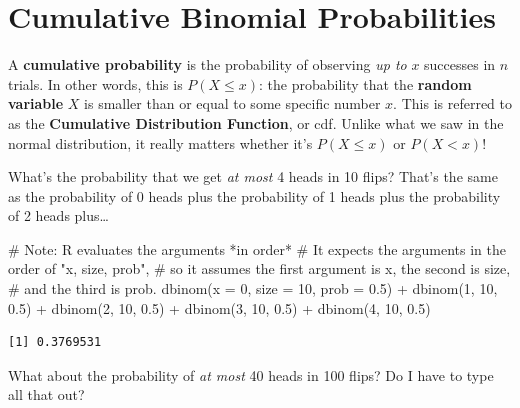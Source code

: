 \documentclass[
  letterpaper,
  DIV=11,
  numbers=noendperiod]{scrreprt}
\newenvironment{Shaded}{\begin{snugshade}}{\end{snugshade}}
\newcommand{\AttributeTok}[1]{\textcolor[rgb]{0.40,0.45,0.13}{#1}}
\newcommand{\CommentTok}[1]{\textcolor[rgb]{0.37,0.37,0.37}{#1}}
\newcommand{\DecValTok}[1]{\textcolor[rgb]{0.68,0.00,0.00}{#1}}
\newcommand{\FloatTok}[1]{\textcolor[rgb]{0.68,0.00,0.00}{#1}}
\newcommand{\FunctionTok}[1]{\textcolor[rgb]{0.28,0.35,0.67}{#1}}
\newcommand{\NormalTok}[1]{\textcolor[rgb]{0.00,0.23,0.31}{#1}}
\newcommand{\SpecialCharTok}[1]{\textcolor[rgb]{0.37,0.37,0.37}{#1}}
\begin{document}
\hypertarget{cumulative-binomial-probabilities}{%
\chapter{Cumulative Binomial
Probabilities}\label{cumulative-binomial-probabilities}}

A \textbf{cumulative probability} is the probability of observing
\emph{up to} \(x\) successes in \(n\) trials. In other words, this is
\(P(X \le x)\): the probability that the \textbf{random variable} \(X\)
is smaller than or equal to some specific number \(x\). This is referred
to as the \textbf{Cumulative Distribution Function}, or cdf. Unlike what
we saw in the normal distribution, it really matters whether it's
\(P(X\le x)\) or \(P(X< x)\)!

What's the probability that we get \emph{at most} 4 heads in 10 flips?
That's the same as the probability of 0 heads plus the probability of 1
heads plus the probability of 2 heads plus\ldots{}

\begin{Shaded}
\begin{Highlighting}[]
\CommentTok{\# Note: R evaluates the arguments *in order*}
\CommentTok{\# It expects the arguments in the order of "x, size, prob",}
\CommentTok{\# so it assumes the first argument is x, the second is size,}
\CommentTok{\# and the third is prob.}
\FunctionTok{dbinom}\NormalTok{(}\AttributeTok{x =} \DecValTok{0}\NormalTok{, }\AttributeTok{size =} \DecValTok{10}\NormalTok{, }\AttributeTok{prob =} \FloatTok{0.5}\NormalTok{) }\SpecialCharTok{+}
  \FunctionTok{dbinom}\NormalTok{(}\DecValTok{1}\NormalTok{, }\DecValTok{10}\NormalTok{, }\FloatTok{0.5}\NormalTok{) }\SpecialCharTok{+}
  \FunctionTok{dbinom}\NormalTok{(}\DecValTok{2}\NormalTok{, }\DecValTok{10}\NormalTok{, }\FloatTok{0.5}\NormalTok{) }\SpecialCharTok{+}
  \FunctionTok{dbinom}\NormalTok{(}\DecValTok{3}\NormalTok{, }\DecValTok{10}\NormalTok{, }\FloatTok{0.5}\NormalTok{) }\SpecialCharTok{+}
  \FunctionTok{dbinom}\NormalTok{(}\DecValTok{4}\NormalTok{, }\DecValTok{10}\NormalTok{, }\FloatTok{0.5}\NormalTok{)}
\end{Highlighting}
\end{Shaded}

\begin{verbatim}
[1] 0.3769531
\end{verbatim}

What about the probability of \emph{at most} 40 heads in 100 flips? Do I
have to type all that out?
\end{document}
